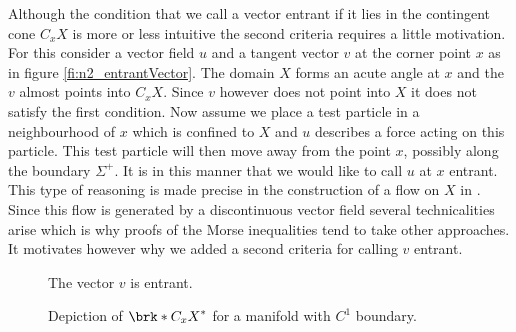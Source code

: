 Although the condition that we call a vector entrant if it lies in the contingent cone $C_xX$ is more or less intuitive
the second criteria requires a little motivation.
For this consider a vector field $u$ and a tangent vector $v$ at the corner point $x$ as in figure \ref{fi:n2_entrantVector}.
The domain $X$ forms an acute angle at $x$ and the $v$ almost points into $C_xX$.
Since $v$ however does not point into $X$ it does not satisfy the first condition.
Now assume we place a test particle in a neighbourhood of $x$ which is confined to $X$ and $u$ describes a force acting on this particle.
This test particle
will then move away from the point $x$, possibly along the boundary $\Sigma^+$.
It is in this manner that we would like to call $u$ at $x$ entrant.
This type of reasoning is made precise in the construction of a flow on $X$ in \cite{Handron2002}.
Since this flow is generated by a discontinuous vector field several technicalities arise which is why proofs of the Morse inequalities tend to take other approaches.
It motivates however why we added a second criteria for calling $v$ entrant.
\begin{figure}
  \centering
  \begin{minipage}[h]{0.45\textwidth}
    \centering
    
    \caption{The vector $v$ is entrant.}
    \label{fi:n2_entrantVector}
  \end{minipage}
  \hfill
  \begin{minipage}[h]{0.45\textwidth}
    \centering
    
    \caption{Depiction of $\brk*{C_xX}^*$ for a manifold with $C^1$ boundary.}
    \label{fi:n2_contingentCone_smooth}
  \end{minipage}
\end{figure}

